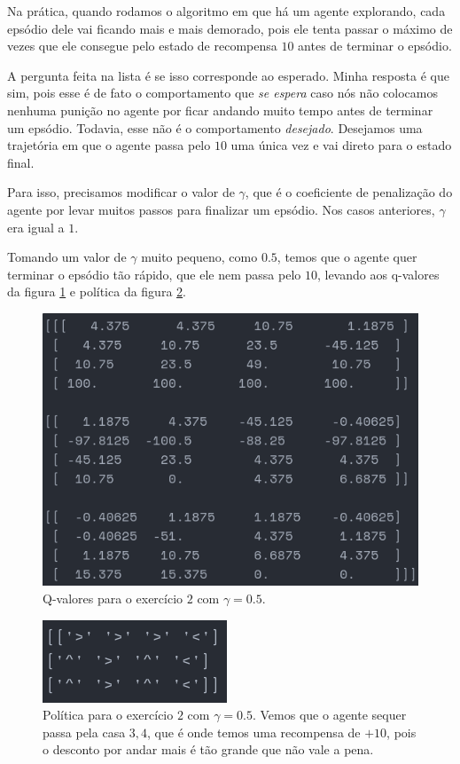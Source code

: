 \documentclass[12pt, a4paper, oneside]{article}
\begin{document}
Na prática, quando rodamos o algoritmo em que há um agente explorando, cada
epsódio dele vai ficando mais e mais demorado, pois ele tenta passar o máximo de
vezes que ele consegue pelo estado de recompensa $10$ antes de terminar o
epsódio.

A pergunta feita na lista é se isso corresponde ao esperado. Minha resposta é
que sim, pois esse é de fato o comportamento que \textit{se espera} caso nós não
colocamos nenhuma punição no agente por ficar andando muito tempo antes de
terminar um epsódio. Todavia, esse não é o comportamento \textit{desejado}.
Desejamos uma trajetória em que o agente passa pelo $10$ uma única vez e vai
direto para o estado final.

Para isso, precisamos modificar o valor de $\gamma$, que é o coeficiente de
penalização do agente por levar muitos passos para finalizar um epsódio. Nos
casos anteriores, $\gamma$ era igual a $1$.

Tomando um valor de $\gamma$ muito pequeno, como $0.5$, temos que o agente quer
terminar o epsódio tão rápido, que ele nem passa pelo $10$, levando aos
q-valores da figura \ref{q-values-ex2.1.png} e política da figura
\ref{policy-ex2.1.png}.

\begin{figure}[h]
\centering
\includegraphics[scale=0.7]{Res/q-values-ex2.1.png}
\caption{Q-valores para o exercício $2$ com $\gamma=0.5$.}
\label{q-values-ex2.1.png}
\end{figure}

\begin{figure}[h]
\centering
\includegraphics[scale=0.9]{Res/policy-ex2.1.png}
\caption{Política para o exercício $2$ com $\gamma=0.5$. Vemos que o agente
sequer passa pela casa $3,4$, que é onde temos uma recompensa de $+10$, pois o
desconto por andar mais é tão grande que não vale a pena.}
\label{policy-ex2.1.png}
\end{figure}
\end{document}
